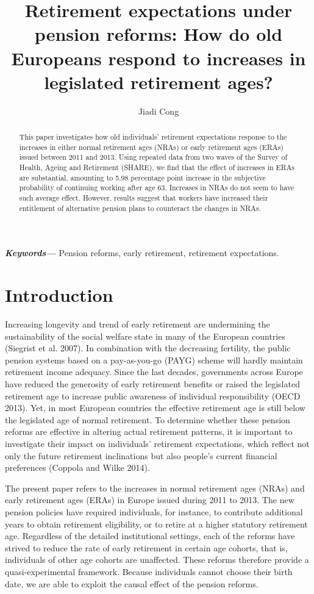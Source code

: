 \documentclass[a4paper]{article}
\title{Retirement expectations under pension reforms: How do old Europeans respond to increases in legislated retirement ages?}
\author{Jiadi Cong}
\providecommand{\keywords}[1]
{
  \small	
  \textbf{\textit{Keywords---}} #1
}
\begin{document}
  \maketitle

\begin{abstract}
This paper investigates how old individuals’ retirement expectations response to the increases in either normal retirement ages (NRAs) or early retirement ages (ERAs) issued between 2011 and 2013. Using repeated data from two waves of the Survey of Health, Ageing and Retirement (SHARE), we find that the effect of increases in ERAs are substantial, amounting to 5.98 percentage point increase in the subjective probability of continuing working after age 63. Increases in NRAs do not seem to have such average effect. However, results suggest that workers have increased their entitlement of alternative pension plans to counteract the changes in NRAs. 
\end{abstract}

\keywords{Pension reforms, early retirement, retirement expectations.}

\doublespacing


\section{Introduction}

Increasing longevity and trend of early retirement are undermining the sustainability of the social welfare state in many of the European countries (Siegrist et al. 2007). In combination with the decreasing fertility, the public pension systems based on a pay-as-you-go (PAYG) scheme will hardly maintain retirement income adequacy. Since the last decades, governments across Europe have reduced the generosity of early retirement benefits or raised the legislated retirement age to increase public awareness of individual responsibility (OECD 2013). Yet, in most European countries the effective retirement age is still below the legislated age of normal retirement. To determine whether these pension reforms are effective in altering actual retirement patterns, it is important to investigate their impact on individuals’ retirement expectations, which reflect not only the future retirement inclinations but also people’s current financial preferences (Coppola and Wilke 2014). 

The present paper refers to the increases in normal retirement ages (NRAs) and early retirement ages (ERAs) in Europe issued during 2011 to 2013. The new pension policies have required individuals, for instance, to contribute additional years to obtain retirement eligibility, or to retire at a higher statutory retirement age. Regardless of the detailed institutional settings, each of the reforms have strived to reduce the rate of early retirement in certain age cohorts, that is, individuals of other age cohorts are unaffected. These reforms therefore provide a quasi-experimental framework. Because individuals cannot choose their birth date, we are able to exploit the causal effect of the pension reforms. 
\end{document}
